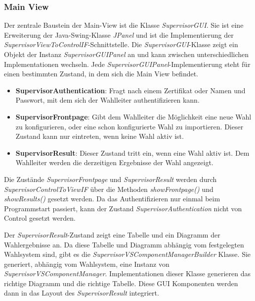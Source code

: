 \documentclass[parskip=full]{scrartcl}
\newcommand{\textitx}[1]{\mbox{\textit{#1}}}
\newcommand{\fakeparagraph}[1]{\textbf{#1}}
\begin{document}
		\subsubsection{Main View}
		Der zentrale Baustein der Main-View ist die Klasse \textitx{SupervisorGUI}. Sie ist eine Erweiterung der Java-Swing-Klasse \textit{JPanel} und ist die Implementierung der \textit{SupervisorViewToControlIF}-Schnittstelle. Die \textitx{SupervisorGUI}-Klasse zeigt ein Objekt der Instanz \textitx{SupervisorGUIPanel} an und kann zwischen unterschiedlichen Implementationen wechseln. Jede \textitx{SupervisorGUIPanel}-Implementierung steht für einen bestimmten Zustand, in dem sich die Main View befindet.
		\begin{itemize}
			\item\fakeparagraph{SupervisorAuthentication}: Fragt nach einem Zertifikat oder Namen und Passwort, mit dem sich der Wahlleiter authentifizieren kann.
			\item\fakeparagraph{SupervisorFrontpage}: Gibt dem Wahlleiter die Möglichkeit eine neue Wahl zu konfigurieren, oder eine schon konfigurierte Wahl zu importieren. Dieser Zustand kann nur eintreten, wenn keine Wahl aktiv ist.
			\item\fakeparagraph{SupervisorResult}: Dieser Zustand tritt ein, wenn eine Wahl aktiv ist. Dem Wahlleiter werden die derzeitigen Ergebnisse der Wahl angezeigt.
		\end{itemize}
	
		Die Zustände \textitx{SupervisorFrontpage} und \textitx{SupervisorResult} werden durch \textit{SupervisorControlToViewIF} über die Methoden \textitx{showFrontpage()} und \textitx{showResults()} gesetzt werden. Da das Authentifizieren nur einmal beim Programmstart passiert, kann der Zustand \textit{SupervisorAuthentication} nicht von Control gesetzt werden.
		
		Der \textitx{SupervisorResult}-Zustand zeigt eine Tabelle und ein Diagramm der Wahlergebnisse an. Da diese Tabelle und Diagramm abhängig vom festgelegten Wahlsystem sind, gibt es die \textit{SupervisorVSComponentManagerBuilder} Klasse. Sie generiert, abhängig vom Wahlsystem, eine Instanz von \textit{SupervisorVSComponentManager}. Implementationen dieser Klasse generieren das richtige Diagramm und die richtige Tabelle. Diese GUI Komponenten werden dann in das Layout des \textitx{SupervisorResult} integriert.
		
\end{document}
